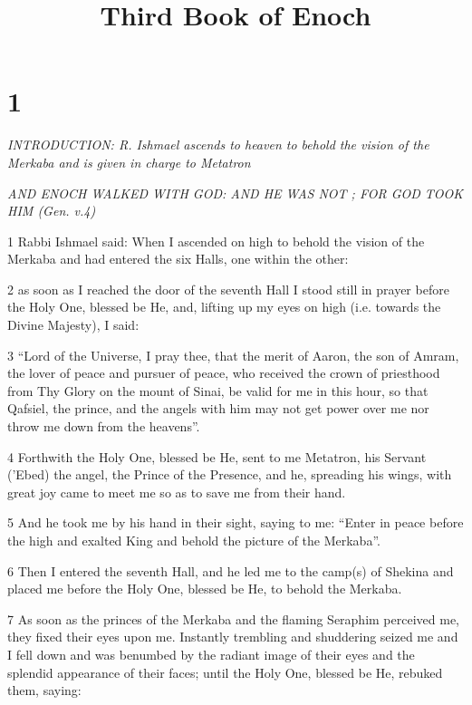

\title{Third Book of Enoch}

\chapter{1}

\par \textit{INTRODUCTION: R. Ishmael ascends to heaven to behold the vision of the Merkaba and is given in charge to Metatron}

\par \textit{AND ENOCH WALKED WITH GOD: AND HE WAS NOT ; FOR GOD TOOK HIM (Gen. v.4)}

\par 1 Rabbi Ishmael said: When I ascended on high to behold the vision of the Merkaba and had entered the six Halls, one within the other: 

\par 2 as soon as I reached the door of the seventh Hall I stood still in prayer before the Holy One, blessed be He, and, lifting up my eyes on high (i.e. towards the Divine Majesty), I said: 

\par 3 “Lord of the Universe, I pray thee, that the merit of Aaron, the son of Amram, the lover of peace and pursuer of peace, who received the crown of priesthood from Thy Glory on the mount of Sinai, be valid for me in this hour, so that Qafsiel, the prince, and the angels with him may not get power over me nor throw me down from the heavens”. 

\par 4 Forthwith the Holy One, blessed be He, sent to me Metatron, his Servant ('Ebed) the angel, the Prince of the Presence, and he, spreading his wings, with great joy came to meet me so as to save me from their hand. 

\par 5 And he took me by his hand in their sight, saying to me: “Enter in peace before the high and exalted King and behold the picture of the Merkaba”. 

\par 6 Then I entered the seventh Hall, and he led me to the camp(s) of Shekina and placed me before the Holy One, blessed be He, to behold the Merkaba.

\par 7 As soon as the princes of the Merkaba and the flaming Seraphim perceived me, they fixed their eyes upon me. Instantly trembling and shuddering seized me and I fell down and was benumbed by the radiant image of their eyes and the splendid appearance of their faces; until the Holy One, blessed be He, rebuked them, saying: 

